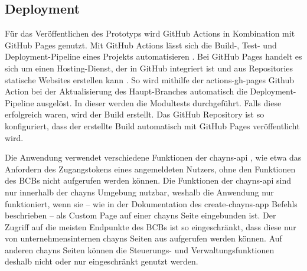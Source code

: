 \subsection{Deployment}
Für das Veröffentlichen des Prototyps wird GitHub Actions in Kombination mit GitHub Pages genutzt. Mit GitHub Actions lässt sich die Build-, Test- und Deployment-Pipeline eines Projekts automatisieren \cite{GitHubActions}. Bei GitHub Pages handelt es sich um einen Hosting-Dienst, der in GitHub integriert ist und aus Repositories statische Websites erstellen kann \cite{GitHubPages}. So wird mithilfe der actions-gh-pages Github Action \cite{ActionsGhPages} bei der Aktualisierung des Haupt-Branches automatisch die Deployment-Pipeline ausgelöst. In dieser werden die Modultests durchgeführt. Falls diese erfolgreich waren, wird der Build erstellt. Das GitHub Repository ist so konfiguriert, dass der erstellte Build automatisch mit GitHub Pages veröffentlicht wird.

Die Anwendung verwendet verschiedene Funktionen der chayns-api \cite{ChaynsApi}, wie etwa das Anfordern des Zugangstokens eines angemeldeten Nutzers, ohne den Funktionen des \ac{BCB}s nicht aufgerufen werden können. Die Funktionen der chayns-api sind nur innerhalb der chayns Umgebung nutzbar, weshalb die Anwendung nur funktioniert, wenn sie – wie in der Dokumentation des create-chayns-app Befehls beschrieben \cite{CreateChaynsApp} – als Custom Page auf einer chayns Seite eingebunden ist. Der Zugriff auf die meisten Endpunkte des \ac{BCB}s ist so eingeschränkt, dass diese nur von unternehmensinternen chayns Seiten aus aufgerufen werden können. Auf anderen chayns Seiten können die Steuerungs- und Verwaltungsfunktionen deshalb nicht oder nur eingeschränkt genutzt werden.
